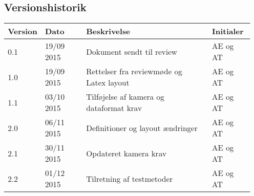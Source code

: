 \subsection{Versionshistorik}

\begin{center}
		\begin{longtable}{ | m{1.5cm}| m{2cm}| m{7cm}| m{2cm}| } 
			\hline
			\textbf{Version} & \textbf{Dato}  & \textbf{Beskrivelse} & \textbf{Initialer}  \\ 
			\hline
			0.1 &  19/09 2015  & Dokument sendt til review & AE og AT \\
			\hline
			1.0  &  19/09 2015 & Rettelser fra reviewmøde og Latex layout & AE og AT \\
			\hline
			1.1  &  03/10 2015 &  Tilføjelse af kamera og dataformat krav & AE og AT \\
			\hline
			2.0  &  06/11 2015  & Definitioner og layout ændringer & AE og AT \\
			\hline
			2.1  &  30/11 2015  & Opdateret kamera krav & AE og AT \\
			\hline
			2.2  &  01/12 2015  & Tilretning af testmetoder & AE og AT \\
			\hline
		\end{longtable}
		
	\end{center}
	\pagebreak